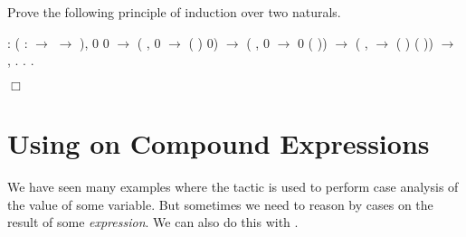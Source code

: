 \documentclass[12pt]{report}
\begin{document}
 Prove the following principle of induction over two naturals. \begin{coqdoccode}
\coqdocemptyline
\coqdocnoindent
{} : \coqdockw{\ensuremath{\forall}} ( :  \ensuremath{\rightarrow}  \ensuremath{\rightarrow} ), \coqdoceol
\coqdocindent{1.00em}
 0 0 \ensuremath{\rightarrow}\coqdoceol
\coqdocindent{1.00em}
(\coqdockw{\ensuremath{\forall}} ,   0 \ensuremath{\rightarrow}  ( ) 0) \ensuremath{\rightarrow}\coqdoceol
\coqdocindent{1.00em}
(\coqdockw{\ensuremath{\forall}} ,  0  \ensuremath{\rightarrow}  0 ( )) \ensuremath{\rightarrow}\coqdoceol
\coqdocindent{1.00em}
(\coqdockw{\ensuremath{\forall}}  ,    \ensuremath{\rightarrow}  ( ) ( )) \ensuremath{\rightarrow}\coqdoceol
\coqdocindent{1.00em}
\coqdockw{\ensuremath{\forall}}  ,   .\coqdoceol
\coqdocnoindent
{}.\coqdoceol
 .\coqdoceol
\end{coqdoccode}
\ensuremath{\Box} \begin{coqdoccode}
\coqdocemptyline
\end{coqdoccode}
\section{Using \texorpdfstring{\protect{}}{destruct} on Compound Expressions}



 We have seen many examples where the  tactic is
    used to perform case analysis of the value of some variable.  But
    sometimes we need to reason by cases on the result of some
    \textit{expression}.  We can also do this with .
\end{document}
